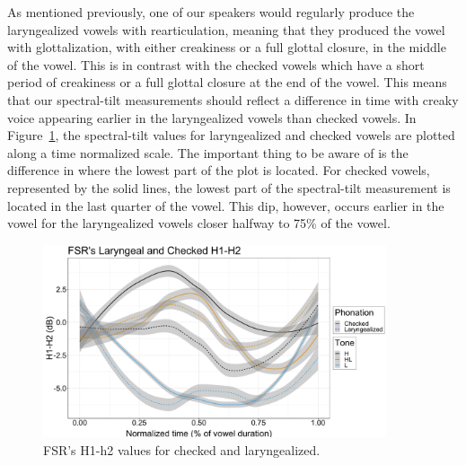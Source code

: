 \documentclass[12pt, letterpaper]{article}
\begin{document}
As mentioned previously, one of our speakers would regularly produce the laryngealized vowels with rearticulation, meaning that they produced the vowel with glottalization, with either creakiness or a full glottal closure, in the middle of the vowel. This is in contrast with the checked vowels which have a short period of creakiness or a full glottal closure at the end of the vowel. This means that our spectral-tilt measurements should reflect a difference in time with creaky voice appearing earlier in the laryngealized vowels than checked vowels. In Figure~\ref{fig:FSRh1h2checked}, the spectral-tilt values for laryngealized and checked vowels are plotted along a time normalized scale. The important thing to be aware of is the difference in where the lowest part of the plot is located. For checked vowels, represented by the solid lines, the lowest part of the spectral-tilt measurement is located in the last quarter of the vowel. This dip, however, occurs earlier in the vowel for the laryngealized vowels closer halfway to 75\% of the vowel. 
\begin{figure}[!ht]
	\includegraphics[width=0.9\textwidth]{../h1h2_CheckedLaryngeal.png}
	\caption{FSR's H1-h2 values for checked and laryngealized.}
	\label{fig:FSRh1h2checked} 
\end{figure}
\end{document}
